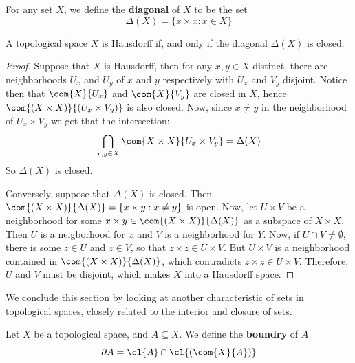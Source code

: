 \begin{definition}
    For any set $X$, we define the \textbf{diagonal} of $X$ to be the set
    \begin{equation}
        \Delta(X)=\{x \times x : x \in X\}
    \end{equation}
\end{definition}

\begin{theorem}\label{1.6.13}
    A topological space $X$ is Hausdorff if, and only if the diagonal
    $\Delta(X)$ is closed.
\end{theorem}
\begin{proof}
    Suppose that $X$ is Hausdorff, then for any  $x,y \in X$ distinct, there are
    neighborhoods $U_x$ and  $U_y$ of $x$ and  $y$ respectively with $U_x$ and
    $V_y$ disjoint. Notice then that  $\com{X}{U_x}$ and $\com{X}{V_y}$ are
    closed in $X$, hence  $\com{(X \times X)}{(U_x \times V_y)}$ is also closed.
    Now, since $x \neq y$ in the neighborhood of $U_x \times V_y$ we get that
    the intersection:
    \begin{equation*}
        \bigcap_{x,y \in X}{\com{X \times X}{U_x \times V_y}}=\Delta(X)
    \end{equation*}
    So $\Delta(X)$ is closed.

    Conversely, suppose that $\Delta(X)$ is closed. Then $\com{(X \times
X)}{\Delta(X)}=\{x \times y : x \neq y\}$ is open. Now, let $U \times V$ be a
neighborhood for some  $x \times y \in \com{(X \times X)}{\Delta(X)}$ as a
subspace of $X \times X$. Then  $U$ is a neigborhood for  $x$ and  $V$ is a
neighborhood for  $Y$. Now, if  $U \cap V \neq \emptyset$, there is some  $z \in
U$ and  $z \in V$, so that  $z \times z \in U \times V$. But  $U \times V$ is a
neighborhood contained in  $\com{(X \times X)}{\Delta(X)}$, which contradicts $z
\times z \in U \times V$. Therefore,  $U$ and  $V$ must be disjoint, which makes
 $X$ into a Hausdorff space.
\end{proof}
 We conclude this section by looking at another characteristic of sets in
 topological spaces, closely related to the interior and closure of sets.

 \begin{definition}
     Let $X$ be a topological space, and  $A \subseteq X$. We define the
     \textbf{boundry} of $A$
     \begin{equation}
         \partial{A}=\cl{A} \cap \cl{(\com{X}{A})}
     \end{equation}
 \end{definition}

